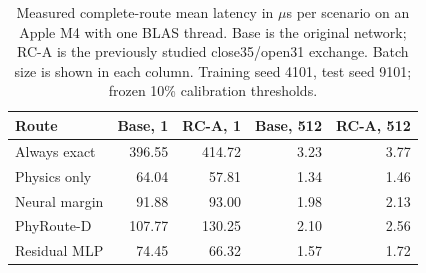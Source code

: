 \begin{table}[tb]
\caption{Measured complete-route mean latency in $\mu$s per scenario on an Apple M4 with one BLAS thread. Base is the original network; RC-A is the previously studied close35/open31 exchange. Batch size is shown in each column. Training seed 4101, test seed 9101; frozen 10\% calibration thresholds.}
\label{tab:latency}
\centering\small
\begin{tabular}{lrrrr}
\toprule
Route & Base, 1 & RC-A, 1 & Base, 512 & RC-A, 512 \\
\midrule
Always exact & 396.55 & 414.72 & 3.23 & 3.77 \\
Physics only & 64.04 & 57.81 & 1.34 & 1.46 \\
Neural margin & 91.88 & 93.00 & 1.98 & 2.13 \\
PhyRoute-D & 107.77 & 130.25 & 2.10 & 2.56 \\
Residual MLP & 74.45 & 66.32 & 1.57 & 1.72 \\
\bottomrule
\end{tabular}
\end{table}
